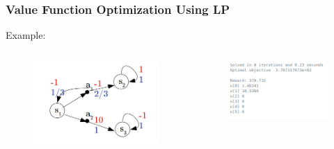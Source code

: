 \documentclass[aspectratio=169]{beamer}
\begin{document}
\begin{frame}
	\frametitle{Value Function Optimization Using LP}
	Example:
	\begin{columns}
	
		\begin{column}{0.5\textwidth}
			\begin{figure}
				\centering
				\includegraphics[scale=.4]{exmpl.png}
			\end{figure}
		\end{column}

		\begin{column}{0.5\textwidth}
		\begin{figure}
				\centering
				\includegraphics[scale=.6]{lp_gurobi.png}
			\end{figure}
		\end{column}

	\end{columns}


	
\end{frame}
\end{document}
